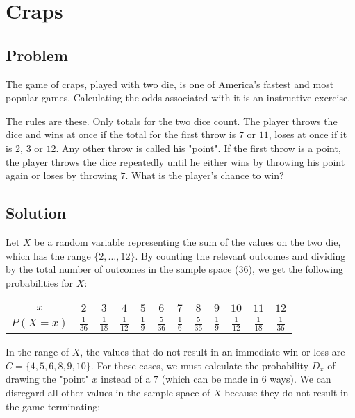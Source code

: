 \documentclass{article}
\date{}
\author{Kaan Aksoy | Feb 25, 2020}
\begin{document}
\maketitle
\section{Craps}
\subsection{Problem}
The game of craps, played with two die, is one of 
America's fastest and most popular games. Calculating 
the odds associated with it is an instructive exercise.

The rules are these. Only totals for the two dice count. 
The player throws the dice and wins at once if the total 
for the first throw is $7$ or $11$, loses at once if it is 
$2$, $3$ or $12$. Any other throw is called his "point". If 
the first throw is a point, the player throws the dice 
repeatedly until he either wins by throwing his point 
again or loses by throwing $7$. What is the player's chance 
to win?			

\subsection{Solution}

Let $X$ be a random variable representing the sum of 
the values on the two die, which has the range 
$\{2,\ldots,12\}$. By counting the relevant outcomes and dividing
by the total number of outcomes in the sample space ($36$), we 
get the following probabilities for $X$:

\vspace{0.3cm}
\begin{center}
\begin{tabular}{ |c|c|c|c|c|c|c|c|c|c|c|c| } 
 $x$ & $2$ & $3$ & $4$ & $5$ & $6$ & $7$ & $8$ & $9$ & $10$ & $11$ & $12$ \\
 \hline
 $P(X=x)$ & $\frac{1}{36}$ & $\frac{1}{18}$ & $\frac{1}{12}$ & 
 $\frac{1}{9}$ & $\frac{5}{36}$ & $\frac{1}{6}$ & 
 $\frac{5}{36}$ & $\frac{1}{9}$ & $\frac{1}{12}$ & 
 $\frac{1}{18}$ & $\frac{1}{36}$ \\
\end{tabular}
\end{center} 
\vspace{0.3cm}

In the range of $X$, the values that do not result in an 
immediate win or loss are $C = \{4,5,6,8,9,10\}$. 
For these cases, we must calculate the probability $D_x$ of drawing the "point" $x$ 
instead of a $7$ (which can be made in $6$ ways). We can disregard all other 
values in the sample space of $X$ because they do not result in the 
game terminating:
\end{document}
